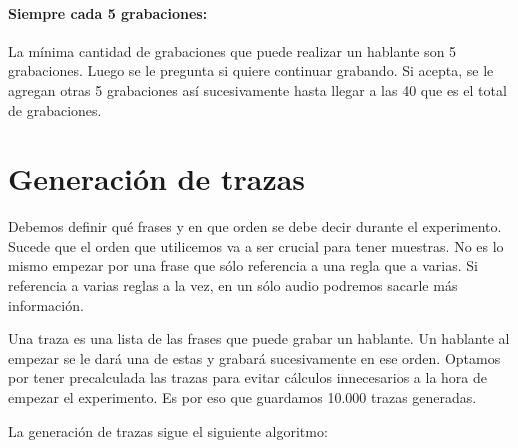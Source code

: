 \documentclass[11pt,a4paper,twoside]{tesis}
\begin{document}
\paragraph{Siempre cada 5 grabaciones:}
La mínima cantidad de grabaciones que puede realizar un hablante son 5 grabaciones. Luego se le pregunta si quiere continuar grabando. Si acepta, se le agregan otras 5 grabaciones así sucesivamente hasta llegar a las 40 que es el total de grabaciones.

\section{Generación de trazas}



Debemos definir qué frases y en que orden se debe decir durante el experimento. Sucede que el orden que utilicemos va a ser crucial para tener muestras. No es lo mismo empezar por una frase que sólo referencia a una regla que a varias. Si referencia a varias reglas a la vez, en un sólo audio podremos sacarle más información.

Una traza es una lista de las frases que puede grabar un hablante. Un hablante al empezar se le dará una de estas y grabará sucesivamente en ese orden. Optamos por tener precalculada las trazas para evitar cálculos innecesarios a la hora de empezar el experimento. Es por eso que guardamos 10.000 trazas generadas. 

La generación de trazas sigue el siguiente algoritmo:
\end{document}
